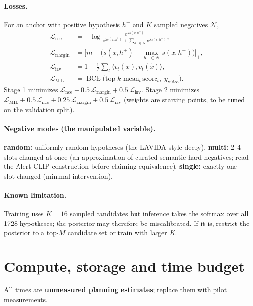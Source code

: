\documentclass[11pt,a4paper]{article}
\begin{document}
\paragraph{Losses.} For an anchor with positive hypothesis $h^+$ and $K$ sampled negatives $\mathcal N$,
\begin{align}
\mathcal L_{\text{nce}} &= -\log\frac{e^{\lambda s(x,h^+)}}{e^{\lambda s(x,h^+)}+\sum_{h^-\in\mathcal N}e^{\lambda s(x,h^-)}},\\
\mathcal L_{\text{margin}} &= \big[m-\big(s(x,h^+)-\max_{h^-\in\mathcal N}s(x,h^-)\big)\big]_+,\\
\mathcal L_{\text{inv}} &= 1-\tfrac1T\textstyle\sum_t\langle v_t(x),v_t(\tilde x)\rangle,\\
\mathcal L_{\text{MIL}} &= \operatorname{BCE}\big(\text{top-}k\text{ mean}_t\,\text{score}_t,\; y_{\text{video}}\big).
\end{align}
Stage 1 minimizes $\mathcal L_{\text{nce}}+0.5\,\mathcal L_{\text{margin}}+0.5\,\mathcal L_{\text{inv}}$. Stage 2 minimizes $\mathcal L_{\text{MIL}}+0.5\,\mathcal L_{\text{nce}}+0.25\,\mathcal L_{\text{margin}}+0.5\,\mathcal L_{\text{inv}}$ (weights are starting points, to be tuned on the validation split).

\paragraph{Negative modes (the manipulated variable).}
\textbf{random:} uniformly random hypotheses (the LAVIDA-style decoy). \textbf{multi:} 2--4 slots changed at once (an approximation of curated semantic hard negatives; read the Alert-CLIP construction before claiming equivalence). \textbf{single:} exactly one slot changed (minimal intervention).

\paragraph{Known limitation.} Training uses $K{=}16$ sampled candidates but inference takes the softmax over all 1728 hypotheses; the posterior may therefore be miscalibrated. If it is, restrict the posterior to a top-$M$ candidate set or train with larger $K$.

\section{Compute, storage and time budget}
\label{sec:compute}
All times are \textbf{unmeasured planning estimates}; replace them with pilot measurements.
\end{document}
